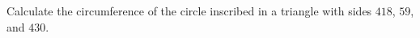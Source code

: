 Calculate the circumference of the circle inscribed in a triangle with sides $418$, $59$, and $430$.
